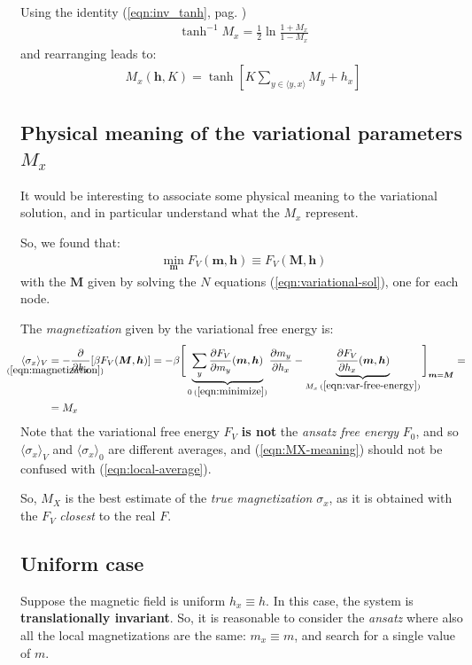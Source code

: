 \documentclass[../../main.tex]{subfiles}
\begin{document}
Using the identity (\ref{eqn:inv_tanh}, pag. \pageref{eqn:inv_tanh})
\begin{align*}
    \tanh^{-1} M_x = \frac{1}{2} \ln \frac{1+M_x}{1-M_x}  
\end{align*}
and rearranging leads to:
\begin{align}\label{eqn:variational-sol}
    M_x(\bm{h}, K) = \tanh \left[K \sum_{y \in \langle y, x\rangle} M_y + h_x\right]
\end{align}

\subsection{Physical meaning of the variational parameters $M_x$}

It would be interesting to associate some physical meaning to the variational solution, and in particular understand what the $M_x$ represent. 

\medskip

So, we found that:
\begin{align*}
    \min_{\bm{m}} F_V(\bm{m}, \bm{h}) \equiv F_V(\bm{M}, \bm{h})
\end{align*}
with the $\bm{M}$ given by solving the $N$ equations (\ref{eqn:variational-sol}), one for each node. 

\medskip

The \textit{magnetization} given by the variational free energy is:
\begin{align} \nonumber
    \langle \sigma_x \rangle_V &\underset{\mathclap{(\ref{eqn:magnetization})}}{=} -\pdv{h_x} [\beta F_V(\bm{M}, \bm{h})] = -\beta \Bigg[\underbrace{\sum_y {\pdv{F_V}{m_y}}(\bm{m}, \bm{h})}_{0\> (\ref{eqn:minimize})} \pdv{m_y}{h_x} - \underbrace{{\pdv{F_V}{h_x}}(\bm{m}, \bm{h})}_{M_x \> (\ref{eqn:var-free-energy})}\Bigg]_{\bm{m} = \bm{M}} =\\
    &= M_x \label{eqn:MX-meaning}
\end{align} 
Note that the variational free energy $F_V$ \textbf{is not} the \textit{ansatz free energy} $F_0$, and so $\langle \sigma_x \rangle_V$ and $\langle \sigma_x \rangle_0$ are different averages, and (\ref{eqn:MX-meaning}) should not be confused with (\ref{eqn:local-average}). 

\medskip

So, $M_X$ is the best estimate of the \textit{true magnetization} $\sigma_x$, as it is obtained with the $F_V$ \textit{closest} to the real $F$.

\subsection{Uniform case}
Suppose the magnetic field is uniform $h_x \equiv h$. In this case, the system is \textbf{translationally invariant}. So, it is reasonable to consider the \textit{ansatz} where also all the local magnetizations are the same: $m_x \equiv m$, and search for a single value of $m$.
\end{document}
